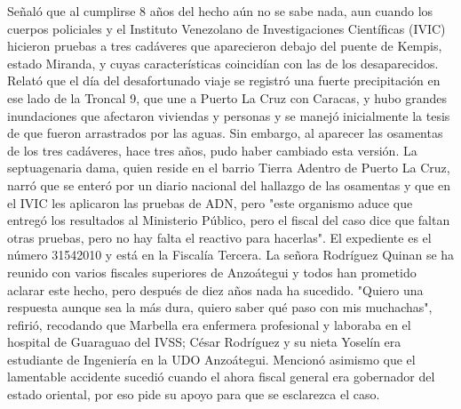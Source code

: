 \documentclass{article}%
\begin{document}
\newline%
%
Señaló que al cumplirse 8 años del hecho aún no se sabe nada, aun cuando los cuerpos policiales y el Instituto Venezolano de Investigaciones Científicas (IVIC) hicieron pruebas a tres cadáveres que aparecieron debajo del puente de Kempis, estado Miranda, y cuyas características coincidían con las de los desaparecidos.%
\newline%
%
Relató que el día del desafortunado viaje se registró una fuerte precipitación en ese lado de la Troncal 9, que une a Puerto La Cruz con Caracas, y hubo grandes inundaciones que afectaron viviendas y personas y se manejó  inicialmente la tesis de que fueron arrastrados por las aguas. Sin embargo, al aparecer las osamentas de los tres cadáveres, hace tres años, pudo haber cambiado esta versión.%
\newline%
%
La septuagenaria dama, quien reside en el barrio Tierra Adentro de Puerto La Cruz, narró que se enteró por un diario nacional del hallazgo de las osamentas y que en el IVIC  les aplicaron las pruebas de ADN, pero "este organismo aduce que entregó los resultados al Ministerio Público, pero el fiscal del caso dice que faltan otras pruebas, pero no hay  falta el reactivo para hacerlas". El expediente es el número 31542010 y está en la Fiscalía Tercera.%
\newline%
%
La señora Rodríguez Quinan se ha reunido con varios fiscales superiores de Anzoátegui y todos han prometido aclarar este hecho, pero después de diez años nada ha sucedido.%
\newline%
%
"Quiero una respuesta aunque sea la más dura, quiero saber qué paso con mis muchachas", refirió, recodando que Marbella era enfermera profesional y laboraba en el hospital de Guaraguao del IVSS; César Rodríguez y su nieta Yoselín era estudiante de Ingeniería en la UDO Anzoátegui.%
\newline%
%
Mencionó asimismo que el lamentable accidente sucedió cuando el ahora fiscal general era gobernador del estado oriental, por eso pide su apoyo para que se esclarezca el caso.%
\newline%
%
\end{document}
